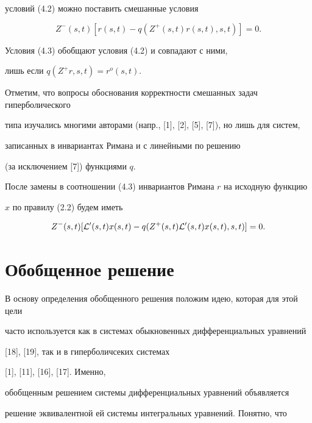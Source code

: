 условий (4.2) можно поставить смешанные условия 


\begin{equation}


Z^{-} (s,t) [ r(s,t) - q (Z^{+} (s,t) r(s,t),s,t) ]=0.


\end{equation}


Условия (4.3) обобщают условия (4.2) и совпадают с ними,


лишь если $q(Z^{+} r,s,t)=r^o (s,t)$. 


Отметим, что вопросы обоснования корректности смешанных задач гиперболического 


типа изучались многими авторами (напр., [1], [2], [5], [7]), но лишь для систем, 


записанных в инвариантах Римана и с линейными по решению 


(за исключением [7]) функциями $q$.





После замены в соотношении (4.3) инвариантов Римана $r$ на исходную функцию 


$x$ по правилу (2.2) будем иметь 


\begin{equation}


Z^{-} (s,t) [ {\cal L}^{\prime}(s,t)x(s,t) - q (Z^{+} (s,t) {\cal L}^{\prime}


(s,t) x(s,t),s,t) ]=0.


\end{equation}








\section{Обобщенное решение}





В основу определения обобщенного решения положим идею, которая для этой цели 


часто используется как в системах обыкновенных дифференциальных уравнений


[18], [19], так и в гиперболичсеких системах


[1], [11], [16], [17]. Именно,


обобщенным решением системы дифференциальных уравнений объявляется 


решение эквивалентной ей системы интегральных уравнений. Понятно, что 


